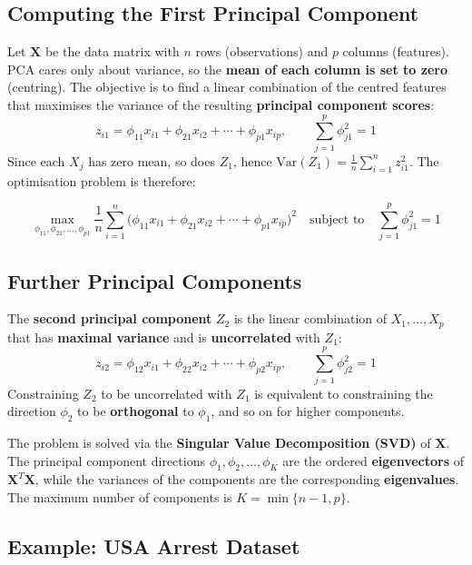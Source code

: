 \documentclass[11pt,a4paper]{article}
\theoremstyle{definition}
\theoremstyle{plain}
\theoremstyle{remark}
\begin{document}
\subsection{Computing the First Principal Component}

Let $\mathbf{X}$ be the data matrix with $n$ rows (observations) and $p$ columns (features). PCA cares only about variance, so the \textbf{mean of each column is set to zero} (centring). The objective is to find a linear combination of the centred features that maximises the variance of the resulting \textbf{principal component scores}:
\[
    z_{i1} = \phi_{11} x_{i1} + \phi_{21} x_{i2} + \cdots + \phi_{p1} x_{ip}, \qquad \sum_{j=1}^{p} \phi_{j1}^2 = 1
\]
Since each $X_j$ has zero mean, so does $Z_1$, hence $\mathrm{Var}(Z_1) = \tfrac{1}{n}\sum_{i=1}^{n} z_{i1}^2$. The optimisation problem is therefore:

\begin{tcolorbox}[colback=blue!5!white,colframe=blue!75!black,title=\textbf{First PC Optimisation Problem}]
\[
    \max_{\phi_{11}, \phi_{21}, \ldots, \phi_{p1}} \frac{1}{n} \sum_{i=1}^{n} \bigl( \phi_{11} x_{i1} + \phi_{21} x_{i2} + \cdots + \phi_{p1} x_{ip} \bigr)^2 \quad \text{subject to} \quad \sum_{j=1}^{p} \phi_{j1}^2 = 1
\]
\end{tcolorbox}

\subsection{Further Principal Components}

The \textbf{second principal component} $Z_2$ is the linear combination of $X_1, \ldots, X_p$ that has \textbf{maximal variance} and is \textbf{uncorrelated} with $Z_1$:
\[
    z_{i2} = \phi_{12} x_{i1} + \phi_{22} x_{i2} + \cdots + \phi_{p2} x_{ip}, \qquad \sum_{j=1}^{p} \phi_{j2}^2 = 1
\]
Constraining $Z_2$ to be uncorrelated with $Z_1$ is equivalent to constraining the direction $\phi_2$ to be \textbf{orthogonal} to $\phi_1$, and so on for higher components.

The problem is solved via the \textbf{Singular Value Decomposition (SVD)} of $\mathbf{X}$. The principal component directions $\phi_1, \phi_2, \ldots, \phi_K$ are the ordered \textbf{eigenvectors} of $\mathbf{X}^T \mathbf{X}$, while the variances of the components are the corresponding \textbf{eigenvalues}. The maximum number of components is $K = \min\{n - 1, p\}$.

\subsection{Example: USA Arrest Dataset}
\end{document}
